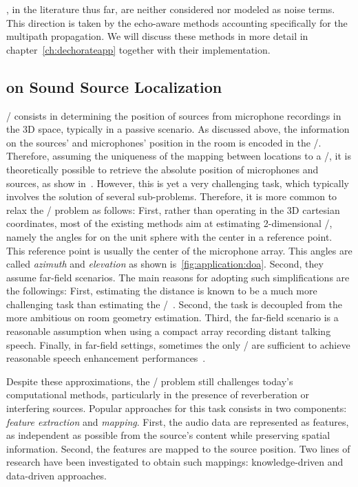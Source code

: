 , in the literature thus far, are neither considered nor modeled as noise terms.
This direction is taken by the echo-aware methods accounting specifically for the multipath propagation.
We will discuss these methods in more detail in chapter~\cref{ch:dechorateapp} together with their implementation.

\subsection{on Sound Source Localization}\label{subsec:application:localization}
\SSLdef/ consists in determining the position of sources from microphone recordings in the 3D space, typically in a passive scenario.
As discussed above, the information on the sources' and microphones' position in the room is encoded in the \RIRs/.
Therefore, assuming the uniqueness of the mapping between locations to a \RIR/, it is theoretically possible to retrieve the absolute position of microphones and sources, as show in~.
However,  this is yet a very challenging task, which typically involves the solution of several sub-problems.
Therefore, it is more common to relax the \SSL/ problem as follows:
First, rather than operating in the  3D cartesian coordinates, most of the existing methods aim at estimating 2-dimensional \DOAdef/, namely the angles for on the unit sphere with the center in a reference point.
This reference point is usually the center of the microphone array.
This angles are called \textit{azimuth} and \textit{elevation} as shown is~\cref{fig:application:doa}.
Second, they assume far-field scenarios.
The main reasons for adopting such simplifications are the followings:
First, estimating the distance is known to be a much more challenging task than estimating the \DOAs/~.
Second, the task is decoupled from the more ambitious on room geometry estimation.
Third, the far-field scenario is a reasonable assumption when using a compact array recording distant talking speech.
Finally, in far-field settings, sometimes the only \DOAs/ are sufficient to achieve reasonable speech enhancement performances~.


\mynewline
Despite these approximations, the \SSL/ problem still challenges today's computational methods, particularly in the presence of reverberation or interfering sources.
Popular approaches for this task consists in two components: \textit{feature extraction} and \textit{mapping}.
First, the audio data are represented as features, as independent as possible from the source's content while preserving spatial information.
Second, the features are mapped to the source position.
Two lines of research have been investigated to obtain such mappings: knowledge-driven and data-driven approaches.

